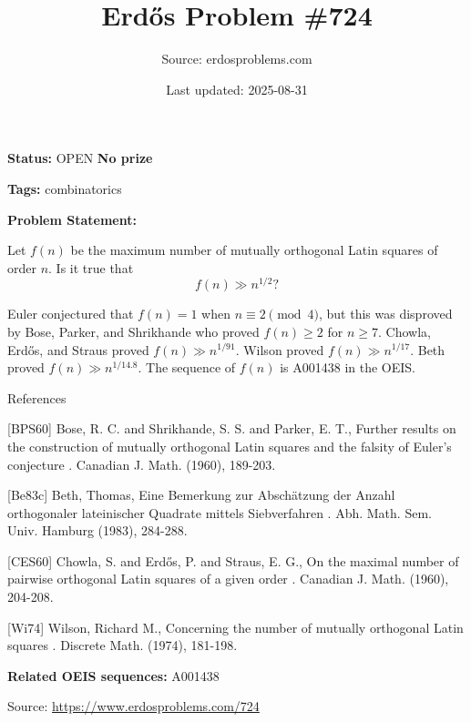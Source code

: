\documentclass{article}
\title{Erd\H{o}s Problem \#724}
\date{Last updated: 2025-08-31}
\author{Source: erdosproblems.com}
\begin{document}
\maketitle

\noindent\textbf{Status:} OPEN \quad \textbf{No prize}

\noindent\textbf{Tags:} combinatorics

\medskip

\noindent\textbf{Problem Statement:}

Let $f(n)$ be the maximum number of mutually orthogonal Latin squares of order $n$. Is it true that\[f(n) \gg n^{1/2}?\]




Euler conjectured that $f(n)=1$ when $n\equiv 2\pmod{4}$, but this was disproved by Bose, Parker, and Shrikhande \cite{BPS60} who proved $f(n)\geq 2$ for $n\geq 7$. Chowla, Erd\H{o}s, and Straus \cite{CES60} proved $f(n) \gg n^{1/91}$. Wilson \cite{Wi74} proved $f(n) \gg n^{1/17}$. Beth \cite{Be83c} proved $f(n) \gg n^{1/14.8}$. The sequence of $f(n)$ is A001438 in the OEIS.




References

[BPS60] Bose, R. C. and Shrikhande, S. S. and Parker, E. T., Further results on the construction of mutually orthogonal Latin squares and the falsity of Euler's conjecture . Canadian J. Math. (1960), 189-203.

[Be83c] Beth, Thomas, Eine Bemerkung zur Absch\"{a}tzung der Anzahl orthogonaler lateinischer Quadrate mittels Siebverfahren . Abh. Math. Sem. Univ. Hamburg (1983), 284-288.

[CES60] Chowla, S. and Erd\H{o}s, P. and Straus, E. G., On the maximal number of pairwise orthogonal Latin squares of a given order . Canadian J. Math. (1960), 204-208.

[Wi74] Wilson, Richard M., Concerning the number of mutually orthogonal Latin squares . Discrete Math. (1974), 181-198.

\noindent\textbf{Related OEIS sequences:} A001438


\bigskip
\noindent\small{Source: \url{https://www.erdosproblems.com/724}}
\end{document}
